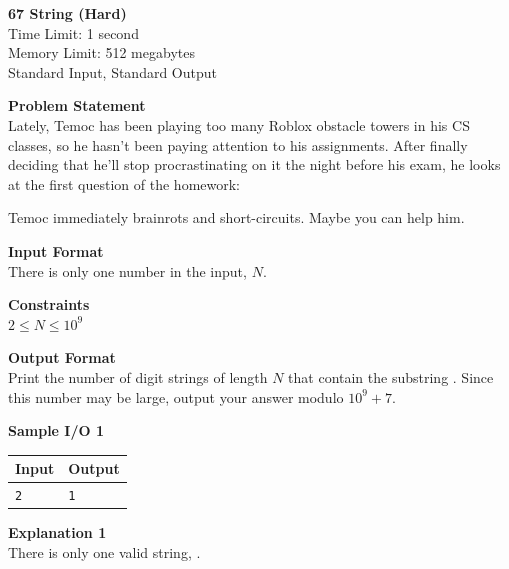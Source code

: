 \documentclass{article}
\begin{document}
\begin{center}
{\LARGE \bf 67 String (Hard)}\\
{\large Time Limit: 1 second}\\
{\large Memory Limit: 512 megabytes}\\
Standard Input, Standard Output
\end{center}

{\noindent \bf Problem Statement}\\
Lately, Temoc has been playing too many Roblox obstacle towers in his CS classes, so he hasn't been paying attention to his assignments. After finally deciding that he'll stop procrastinating on it the night before his exam, he looks at the first question of the homework: \newline

\noindent {} \newline

\noindent Temoc immediately brainrots and short-circuits. Maybe you can help him. \newline

{\noindent \bf Input Format}\\
There is only one number in the input, $N$. \newline

{\noindent \bf Constraints}\\
$2 \leq N \leq 10^9$ \newline

{\noindent \bf Output Format}\\
Print the number of digit strings of length $N$ that contain the substring . Since this number may be large, output your answer modulo $10^9 + 7$. \newline

{\noindent \bf Sample I/O 1}\\
\begin{tabular}{|p{}|p{}|}
    \hline
    \textbf{Input} & \textbf{Output}\\
    \hline
    \texttt{2}
    &
    \texttt{1}\\
    \hline
\end{tabular} \newline \newline

{\noindent \bf Explanation 1}\\
There is only one valid string, . \newline
\end{document}
